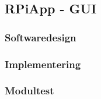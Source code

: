 \documentclass[Rapport/Rapport_main.tex]{subfiles}
\begin{document}
\subsection{RPiApp - GUI}
\subsubsection{Softwaredesign}

\subsubsection{Implementering}

\subsubsection{Modultest}
\end{document}
